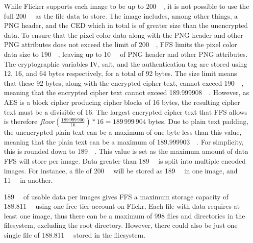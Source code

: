 While Flicker supports each image to be up to \SI{200}{\mega\byte}, it is not possible to use the full \SI{200}{\mega\byte} as the file data to store. The image includes, among other things, a PNG header, and the CED which in total is of greater size than the unencrypted data. To ensure that the pixel color data along with the PNG header and other PNG attributes does not exceed the limit of \SI{200}{\mega\byte}, FFS limits the pixel color data size to \SI{190}{\mega\byte}, leaving up to \SI{10}{\mega\byte} of PNG header and other PNG attributes. The cryptographic variables IV, salt, and the authentication tag are stored using 12, 16, and 64 bytes respectively, for a total of 92 bytes. The size limit means that these 92 bytes, along with the encrypted cipher text, cannot exceed \SI{190}{\mega\byte}, meaning that the encrypted cipher text cannot exceed \SI{189.999908}{\mega\byte}. However, as AES is a block cipher producing cipher blocks of 16 bytes, the resulting cipher text must be a divisible of 16. The largest encrypted cipher text that FFS allows is therefore $floor(\frac{189\,999\,906}{16})*16 = 189\,999\,904$ bytes. Due to plain text padding, the unencrypted plain text can be a maximum of one byte less than this value, meaning that the plain text can be a maximum of \SI{189.999903}{\mega\byte}. For simplicity, this is rounded down to \SI{189}{\mega\byte}. This value is set as the maximum amount of data FFS will store per image. Data greater than \SI{189}{\mega\byte} is split into multiple encoded images. For instance, a file of \SI{200}{\mega\byte} will be stored as \SI{189}{\mega\byte} in one image, and \SI{11}{\mega\byte} in another. 

\SI{189}{\mega\byte} of usable data per images gives FFS a maximum storage capacity of \SI{188.811}{\gia\byte} using one free-tier account on Flickr. Each file with data requires at least one image, thus there can be a maximum of 998 files and directories in the filesystem, excluding the root directory. However, there could also be just one single file of \SI{188.811}{\gia\byte} stored in the filesystem.

